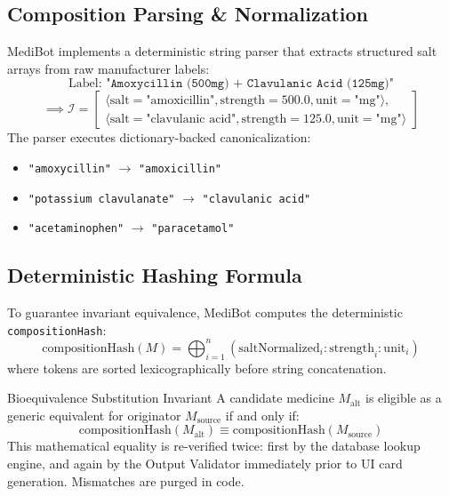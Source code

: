 \documentclass[11pt,a4paper]{article}
\begin{document}
\subsection{Composition Parsing \& Normalization}
MediBot implements a deterministic string parser that extracts structured salt arrays from raw manufacturer labels:
\begin{equation}
  \text{Label: } \texttt{"Amoxycillin (500mg) + Clavulanic Acid (125mg)"}
\end{equation}
\begin{equation}
  \implies \mathcal{I} = \left[
    \begin{array}{l}
      \langle \text{salt}=\text{"amoxicillin"}, \text{strength}=500.0, \text{unit}=\text{"mg"} \rangle, \\
      \langle \text{salt}=\text{"clavulanic acid"}, \text{strength}=125.0, \text{unit}=\text{"mg"} \rangle
    \end{array}
  \right]
\end{equation}
The parser executes dictionary-backed canonicalization:
\begin{itemize}[leftmargin=*]
  \item \texttt{"amoxycillin"} $\to$ \texttt{"amoxicillin"}
  \item \texttt{"potassium clavulanate"} $\to$ \texttt{"clavulanic acid"}
  \item \texttt{"acetaminophen"} $\to$ \texttt{"paracetamol"}
\end{itemize}

\subsection{Deterministic Hashing Formula}
To guarantee invariant equivalence, MediBot computes the deterministic \texttt{compositionHash}:
\begin{equation}
  \text{compositionHash}(M) = \bigoplus_{i=1}^{n} \left( \text{saltNormalized}_i \mathbin{:} \text{strength}_i \mathbin{:} \text{unit}_i \right)
\end{equation}
where tokens are sorted lexicographically before string concatenation. 

\begin{techbox}{Bioequivalence Substitution Invariant}
A candidate medicine $M_{\text{alt}}$ is eligible as a generic equivalent for originator $M_{\text{source}}$ if and only if:
\begin{equation}
  \text{compositionHash}(M_{\text{alt}}) \equiv \text{compositionHash}(M_{\text{source}})
\end{equation}
This mathematical equality is re-verified twice: first by the database lookup engine, and again by the Output Validator immediately prior to UI card generation. Mismatches are purged in code.
\end{techbox}
\end{document}
